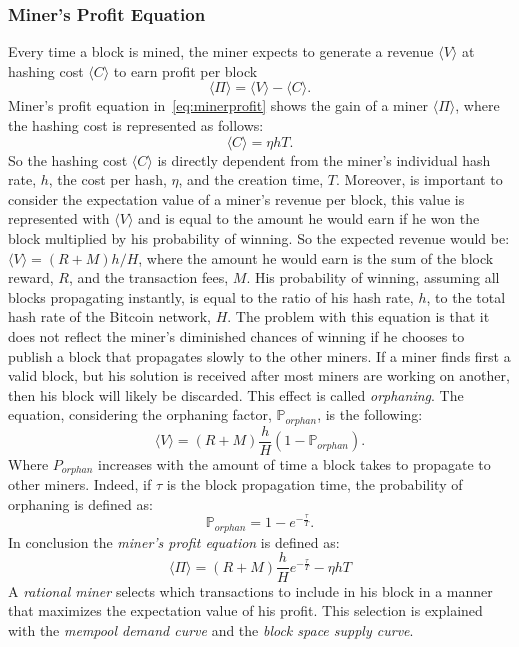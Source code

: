 \documentclass[USenglish]{uit-thesis}
\begin{document}
\subsubsection{Miner's Profit Equation}
Every time a block is mined, the miner expects to generate a revenue $\langle V \rangle$
at hashing cost $\langle C \rangle$ to earn profit per block
\begin{equation}
\label{eq:minerprofit}
\langle \Pi \rangle = \langle V\rangle - \langle C\rangle.
\end{equation}
Miner's profit equation in~\ref{eq:minerprofit} shows the gain of a miner $\langle \Pi \rangle$,
where the hashing cost is represented as follows:
\begin{equation}
\label{eq:hashingcost}
\langle C\rangle = \eta hT.
\end{equation}
So the hashing cost $\langle C\rangle$ is directly dependent from the miner's individual hash rate, $h$,
the cost per hash, $\eta$, and the creation time, $T$. Moreover, is important to consider the
expectation value of a miner's revenue per block, this value is represented with $\langle V\rangle$
and is equal to the amount he would earn if he won the block multiplied by his probability of
winning. So the expected revenue would be:
$\langle V\rangle = (R + M) h/H$,
where the amount he would earn is the sum of
the block reward, $R$, and the transaction fees, $M$.
His probability of winning, assuming all blocks propagating
instantly, is equal to the ratio of his hash
rate, $h$, to the total hash rate of the Bitcoin network,
$H$. The problem with this equation is that it
does not reflect the miner's diminished chances of
winning if he chooses to publish a block that propagates
slowly to the other miners. If a miner finds first a valid block,
but his solution is received after most miners
are working on another, then his block will likely be discarded.
This effect is called \emph{orphaning}. The
equation, considering the orphaning factor, $\mathbb{P}_{orphan}$, is the following:
\begin{equation}
\label{eq:expectedrevenue}
\langle V\rangle = \left(R + M\right)\frac{h}{H}\left(1 - \mathbb{P}_{orphan}\right).
\end{equation}
Where $P_{orphan}$ increases with the amount of time a block takes
to propagate to other miners. Indeed, if $\tau$ is
the block propagation time, the
probability of orphaning is defined as:
\begin{equation}
\label{eq:orphaning}
\mathbb{P}_{orphan} = 1 - e^{-\frac{\tau}{T}}.
\end{equation}
In conclusion the \emph{miner's profit equation} is defined as:
\begin{equation}
\label{eq:minerprofiteq}
\langle \Pi \rangle = (R + M)\frac{h}{H} e^{-\frac{\tau}{T}} -\eta hT
\end{equation}
A \emph{rational miner} selects which transactions to include in his block in a manner that maximizes
the expectation value of his profit. This selection is explained with the \emph{mempool demand curve}
and the \emph{block space supply curve}.
\end{document}
